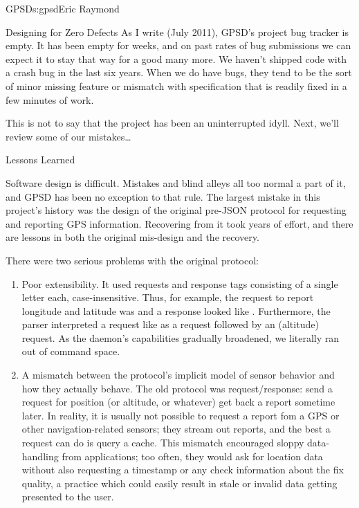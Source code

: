 \begin{aosachapter}{GPSD}{s:gpsd}{Eric Raymond}
\begin{aosasect1}{Designing for Zero Defects}
As I write (July 2011), GPSD's project bug tracker is empty.  It has
been empty for weeks, and on past rates of bug submissions we can
expect it to stay that way for a good many more.  We haven't shipped
code with a crash bug in the last six years.  When we do have bugs,
they tend to be the sort of minor missing feature or mismatch with
specification that is readily fixed in a few minutes of work.

This is not to say that the project has been an uninterrupted idyll.  
Next, we'll review some of our mistakes{\ldots}

\end{aosasect1}

\begin{aosasect1}{Lessons Learned}

Software design is difficult.  Mistakes and blind alleys all too
normal a part of it, and GPSD has been no exception to that rule.  The
largest mistake in this project's history was the design of the
original pre-JSON protocol for requesting and reporting GPS
information.  Recovering from it took years of effort, and there are
lessons in both the original mis-design and the recovery.

There were two serious problems with the original protocol:

\begin{enumerate}

  \item Poor extensibility.  It used requests and response tags
    consisting of a single letter each, case-insensitive. Thus, for
    example, the request to report longitude and latitude was
     and a response looked like . Furthermore, the parser interpreted a request like
     as a  request followed by an 
    (altitude) request.  As the daemon's capabilities gradually
    broadened, we literally ran out of command space.

  \item A mismatch between the protocol's implicit model of sensor
    behavior and how they actually behave.  The old protocol was
    request/response: send a request for position (or altitude, or
    whatever) get back a report sometime later. In reality, it is
    usually not possible to request a report fom a GPS or other
    navigation-related sensors; they stream out reports, and the best
    a request can do is query a cache.  This mismatch encouraged
    sloppy data-handling from applications; too often, they would ask
    for location data without also requesting a timestamp or any check
    information about the fix quality, a practice which could easily
    result in stale or invalid data getting presented to the user.


\end{enumerate}
\end{aosasect1}
\end{aosachapter}
